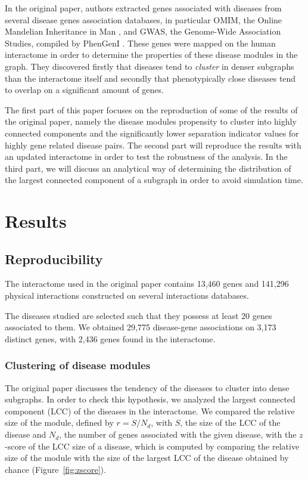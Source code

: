 \documentclass[letterpaper]{article}
\begin{document}
In the original paper, authors extracted genes associated with diseases from several disease genes
association databases, in particular OMIM, the Online Mandelian Inheritance in Man \citep{amberger2008OMIM},
and GWAS, the Genome-Wide Association Studies, compiled by PhenGenI \citep{ramos2014PhenGenI}. These
genes were mapped on the human interactome in order to determine the properties of these disease modules
in the graph. They discovered firstly that diseases tend to \textit{cluster} in denser subgraphs than
the interactome itself and secondly that phenotypically close diseases tend to overlap on a significant
amount of genes.

The first part of this paper focuses on the reproduction of some of the results of the original paper,
namely the disease modules propensity to cluster into highly connected components and the significantly
lower separation indicator values for highly gene related disease pairs. The second part will reproduce
the results with an updated interactome in order to test the robustness of the analysis. In the third
part, we will discuss an analytical way of determining the distribution of the largest connected
component of a subgraph in order to avoid simulation time.

\section{Results}
	\subsection{Reproducibility}\label{subsec:reproducibility}
	The interactome used in the original paper contains 13,460 genes and 141,296 physical interactions
	constructed on several interactions databases.

	The diseases studied are selected such that they possess at least 20 genes associated to them.
	We obtained 29,775 disease-gene associations on 3,173 distinct genes, with 2,436 genes found in the
	interactome.

		\subsubsection{Clustering of disease modules}
		The original paper discusses the tendency of the diseases to cluster into dense subgraphs. In order
		to check this hypothesis, we analyzed the largest connected component (LCC) of the diseases in the
		interactome. We compared the relative size of the module, defined by $r = S/N_d$, with $S$, the size
		of the LCC of the disease and $N_d$, the number of genes associated with the given disease, with
		the $z$-score of the LCC size of a disease, which is computed by comparing the relative size of the
		module with the size of the largest LCC of the disease obtained by chance (Figure~\ref{fig:zscore}).
\end{document}
